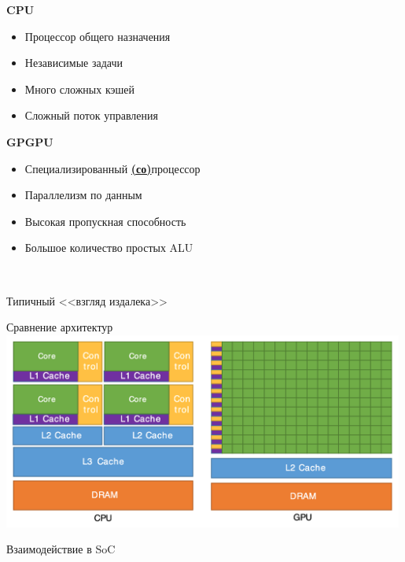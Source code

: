\documentclass[xcolor=table,aspectratio=169]{beamer}
\begin{document}
\begin{frame}[fragile]
  \begin{minipage}[t]{0.49\textwidth}
    \textbf{CPU}
    \begin{itemize}
      \item Процессор общего назначения
      \item Независимые задачи
      \item Много сложных кэшей
      \item Сложный поток управления
    \end{itemize}
  \end{minipage}
  \begin{minipage}[t]{0.49\textwidth}
    \textbf{GPGPU}
    \begin{itemize}
      \item Специализированный \underline{\textbf{(со)}}процессор
      \item Параллелизм по данным
      \item Высокая пропускная способность
      \item Большое количество простых ALU
    \end{itemize}
  \end{minipage}
\\
  \begin{center}
    Типичный <<взгляд издалека>>\\
    \begin{minipage}[t]{0.49\textwidth}
      \begin{center}
      Сравнение архитектур\footnotemark[3]
    \includegraphics[width=0.99\textwidth]{pictures/ArchCPUGPUcores.png}
      \end{center}
    \end{minipage}
    \begin{minipage}[t]{0.49\textwidth}
      \begin{center}
      Взаимодействие в SoC\footnotemark[4]

\end{center}
\end{minipage}
\end{center}
\end{frame}
\end{document}
